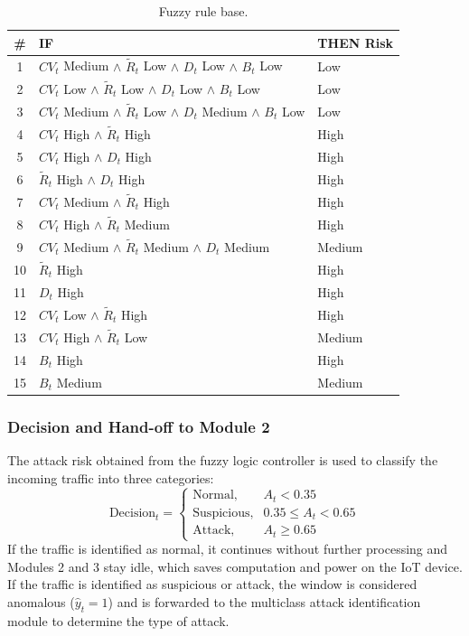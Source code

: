 \documentclass[]{interact}
\theoremstyle{plain}%
\theoremstyle{definition}
\theoremstyle{remark}
\begin{document}
\begin{table}[h]
\centering
\caption{Fuzzy rule base.}
\label{tab:rules}
\begin{tabular}{cll}
\toprule
\# & IF & THEN Risk \\
\midrule
1  & $CV_t$ Medium $\wedge$ $\tilde{R}_t$ Low $\wedge$ $D_t$ Low $\wedge$ $B_t$ Low & Low \\
2  & $CV_t$ Low $\wedge$ $\tilde{R}_t$ Low $\wedge$ $D_t$ Low $\wedge$ $B_t$ Low & Low \\
3  & $CV_t$ Medium $\wedge$ $\tilde{R}_t$ Low $\wedge$ $D_t$ Medium $\wedge$ $B_t$ Low & Low \\
4  & $CV_t$ High $\wedge$ $\tilde{R}_t$ High & High \\
5  & $CV_t$ High $\wedge$ $D_t$ High & High \\
6  & $\tilde{R}_t$ High $\wedge$ $D_t$ High & High \\
7  & $CV_t$ Medium $\wedge$ $\tilde{R}_t$ High & High \\
8  & $CV_t$ High $\wedge$ $\tilde{R}_t$ Medium & High \\
9  & $CV_t$ Medium $\wedge$ $\tilde{R}_t$ Medium $\wedge$ $D_t$ Medium & Medium \\
10 & $\tilde{R}_t$ High & High \\
11 & $D_t$ High & High \\
12 & $CV_t$ Low $\wedge$ $\tilde{R}_t$ High & High \\
13 & $CV_t$ High $\wedge$ $\tilde{R}_t$ Low & Medium \\
14 & $B_t$ High & High \\
15 & $B_t$ Medium & Medium \\
\bottomrule
\end{tabular}
\end{table}

\subsubsection{Decision and Hand-off to Module 2}
The attack risk obtained from the fuzzy logic controller is used to classify the incoming traffic into three categories:
\begin{equation}
  \text{Decision}_t =
  \begin{cases}
    \text{Normal},     & A_t < 0.35\\
    \text{Suspicious}, & 0.35 \le A_t < 0.65\\
    \text{Attack},     & A_t \ge 0.65
  \end{cases}
\end{equation}
If the traffic is identified as normal, it continues without further processing and Modules 2 and 3 stay idle, which saves computation and power on the IoT device. If the traffic is identified as suspicious or attack, the window is considered anomalous ($\hat{y}_t = 1$) and is forwarded to the multiclass attack identification module to determine the type of attack.
\end{document}

